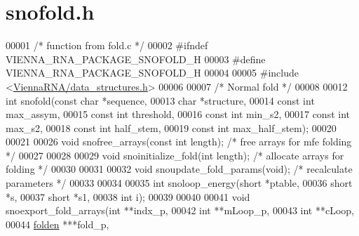 \hypertarget{snofold_8h_source}{}\section{snofold.\+h}
\label{snofold_8h_source}

\begin{DoxyCode}
00001 \textcolor{comment}{/* function from fold.c */}
00002 \textcolor{preprocessor}{#ifndef VIENNA\_RNA\_PACKAGE\_SNOFOLD\_H}
00003 \textcolor{preprocessor}{#define VIENNA\_RNA\_PACKAGE\_SNOFOLD\_H}
00004 
00005 \textcolor{preprocessor}{#include <\hyperlink{data__structures_8h}{ViennaRNA/data\_structures.h}>}
00006 
00007 \textcolor{comment}{/* Normal fold */}
00008 
00012 \textcolor{keywordtype}{int}  snofold(\textcolor{keyword}{const} \textcolor{keywordtype}{char} *sequence,
00013              \textcolor{keywordtype}{char}       *structure,
00014              \textcolor{keyword}{const} \textcolor{keywordtype}{int}  max\_assym,
00015              \textcolor{keyword}{const} \textcolor{keywordtype}{int}  threshold,
00016              \textcolor{keyword}{const} \textcolor{keywordtype}{int}  min\_s2,
00017              \textcolor{keyword}{const} \textcolor{keywordtype}{int}  max\_s2,
00018              \textcolor{keyword}{const} \textcolor{keywordtype}{int}  half\_stem,
00019              \textcolor{keyword}{const} \textcolor{keywordtype}{int}  max\_half\_stem);
00020 
00021 
00026 \textcolor{keywordtype}{void}   snofree\_arrays(\textcolor{keyword}{const} \textcolor{keywordtype}{int} length);  \textcolor{comment}{/* free arrays for mfe folding */}
00027 
00028 
00029 \textcolor{keywordtype}{void}   snoinitialize\_fold(\textcolor{keywordtype}{int} length);    \textcolor{comment}{/* allocate arrays for folding */}
00030 
00031 
00032 \textcolor{keywordtype}{void}   snoupdate\_fold\_params(\textcolor{keywordtype}{void});       \textcolor{comment}{/* recalculate parameters */}
00033 
00034 
00035 \textcolor{keywordtype}{int}    snoloop\_energy(\textcolor{keywordtype}{short} *ptable,
00036                       \textcolor{keywordtype}{short} *s,
00037                       \textcolor{keywordtype}{short} *s1,
00038                       \textcolor{keywordtype}{int}   i);
00039 
00040 
00041 \textcolor{keywordtype}{void}   snoexport\_fold\_arrays(\textcolor{keywordtype}{int}    **indx\_p,
00042                              \textcolor{keywordtype}{int}    **mLoop\_p,
00043                              \textcolor{keywordtype}{int}    **cLoop,
00044                              \hyperlink{group__data__structures_structnode}{folden} ***fold\_p,

\end{DoxyCode}
